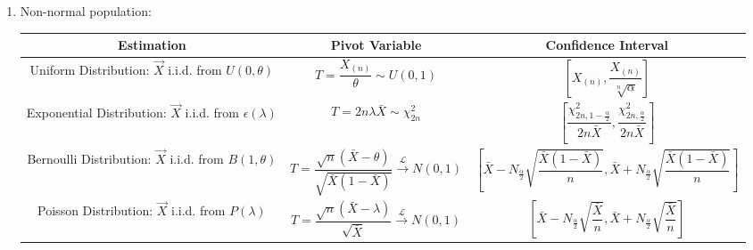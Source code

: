\documentclass[11pt,a4paper]{ctexart}
\numberwithin{equation}{section}%
\begin{document}
\begin{enumerate}
        \item Non-normal population:%
        \begin{table}[H]
            \centering
            \renewcommand\arraystretch{2.2}
            \begin{tabular}{|c|c|c|}
                \hline
                Estimation& Pivot Variable & Confidence Interval\\
                \hline
                \makecell{Uniform Distribution: \\$\vec{X}$ i.i.d. from $U(0,\theta)$}&$T=\dfrac{X_{(n)}}{\theta}\sim U(0,1)$&$\left[X_{(n)},\dfrac{X_{(n)}}{\sqrt[n]{\alpha}}\right]$\\
                \hline
                \makecell{Exponential Distribution: \\$\vec{X}$ i.i.d. from $\epsilon(\lambda)$}&$T=2n\lambda\bar{X}\sim\chi^2_{2n}$&$\left[\dfrac{\chi_{2n,1-\frac{\alpha}{2}}^2}{2n\bar{X}},\dfrac{\chi_{2n,\frac{\alpha}{2}}^2}{2n\bar{X}}\right]$\\
                \hline
                \makecell{Bernoulli Distribution: \\$\vec{X}$ i.i.d. from $B(1,\theta)$}&$T=\dfrac{\sqrt{n}(\bar{X}-\theta)}{\sqrt{\bar{X}(1-\bar{X})}}\xrightarrow[]{\mathscr{L}}N(0,1)$&$\left[\bar{X}-N_{\frac{\alpha}{2}}\sqrt{\dfrac{\bar{X}(1-\bar{X})}{n}},\bar{X}+N_{\frac{\alpha}{2}}\sqrt{\dfrac{\bar{X}(1-\bar{X})}{n}}\right]$\\
                \hline
                \makecell{Poisson Distribution: \\$\vec{X}$ i.i.d. from $P(\lambda)$}&$T=\dfrac{\sqrt{n}(\bar
                X-\lambda)}{\sqrt{\bar{X}}}\xrightarrow[]{\mathscr{L}}N(0,1)$&$\left[\bar{X}-N_{\frac{\alpha}{2}}\sqrt{\dfrac{\bar{X}}{n}},\bar{X}+N_{\frac{\alpha}{2}}\sqrt{\dfrac{\bar{X}}{n}}\right]    $\\
                \hline
            \end{tabular}
        \end{table}
        
    
    

\end{enumerate}
\end{document}
